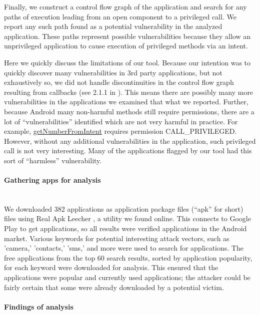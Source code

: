 \documentclass[12pt,a4paper]{article}
\begin{document}
Finally, we construct a control flow graph of the application and search for any
paths of execution leading from an open component to a privileged call. We
report any such path found as a potential vulnerability in the analyzed
application. These paths represent possible vulnerabilities because they allow
an unprivileged application to cause execution of privileged methods via an
intent.

Here we quickly discuss the limitations of our tool. Because our intention was
to quickly discover many vulnerabilities in 3rd party applications, but not
exhaustively so, we did not handle discontinuities in the control flow graph
resulting from callbacks (see 2.1.1 in \cite{grace_systematic_2012}). This means
there are possibly many more vulnerabilities in the applications we examined
that what we reported. Further, because Android many non-harmful methods still
require permissions, there are a lot of ``vulnerabilities'' identified which are
not very harmful in practice. For example,
\href{https://developer.android.com/reference/android/telephony/PhoneNumberUtils.html#getNumberFromIntent\%28android.content.Intent,\%20android.content.Context\%29}{getNumberFromIntent}
requires permission CALL\_PRIVILEGED. However, without any additional
vulnerabilities in the application, such privileged call is not very
interesting. Many of the applications flagged by our tool had this sort of
``harmless'' vulnerability.

\paragraph{Gathering apps for analysis} ~\\

We downloaded 382 applications as application package files (``apk'' for short)
files using Real Apk Leecher \cite{apkleecher}, a utility we found online. This
connects to Google Play to get applications, so all results were verified
applications in the Android market. Various keywords for potential interesting
attack vectors, such as 'camera,' 'contacts,' 'sms,' and more were used to
search for applications. The free applications from the top 60 search results,
sorted by application popularity, for each keyword were downloaded for analysis.
This ensured that the applications were popular and currently used applications;
the attacker could be fairly certain that some were already downloaded by a
potential victim.

\paragraph{Findings of analysis} ~\\
\end{document}
